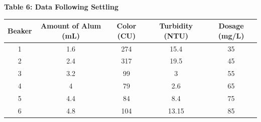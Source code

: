 \begin{center}

{\large{\bf Table 6: Data Following Settling\\}}
\vspace{3 mm}
\begin{tabular}{|c c c c c|}
    \hline
    \textbf{Beaker} & \textbf{Amount of Alum (mL)} & \textbf{Color (CU)} & \textbf{Turbidity (NTU)} & \textbf{Dosage (mg/L)}\\\hline
    1 & 1.6 & 274 & 15.4  & 35 \\
    2 & 2.4 & 317 & 19.5  & 45 \\
    3 & 3.2 & 99  & 3     & 55 \\
    4 & 4   & 79  & 2.6   & 65 \\
    5 & 4.4 & 84  & 8.4   & 75 \\
    6 & 4.8 & 104 & 13.15 & 85 \\\hline
\end{tabular}
\vspace{6mm}



\end{center}
